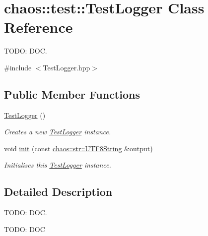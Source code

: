 \hypertarget{classchaos_1_1test_1_1_test_logger}{\section{chaos\-:\-:test\-:\-:Test\-Logger Class Reference}
\label{classchaos_1_1test_1_1_test_logger}
}


T\-O\-D\-O\-: D\-O\-C.  




{\ttfamily \#include $<$Test\-Logger.\-hpp$>$}

\subsection*{Public Member Functions}
\begin{DoxyCompactItemize}
\item 
\hypertarget{classchaos_1_1test_1_1_test_logger_a59b5462eea92053f301b8c5e9c61892f}{\hyperlink{classchaos_1_1test_1_1_test_logger_a59b5462eea92053f301b8c5e9c61892f}{Test\-Logger} ()}\label{classchaos_1_1test_1_1_test_logger_a59b5462eea92053f301b8c5e9c61892f}

\begin{DoxyCompactList}\small\item\em Creates a new \hyperlink{classchaos_1_1test_1_1_test_logger}{Test\-Logger} instance. \end{DoxyCompactList}\item 
void \hyperlink{classchaos_1_1test_1_1_test_logger_a5fec82749e25ffad7ae6b4f47ee0c4ec}{init} (const \hyperlink{classchaos_1_1str_1_1_u_t_f8_string}{chaos\-::str\-::\-U\-T\-F8\-String} \&output)
\begin{DoxyCompactList}\small\item\em Initialises this \hyperlink{classchaos_1_1test_1_1_test_logger}{Test\-Logger} instance. \end{DoxyCompactList}\end{DoxyCompactItemize}


\subsection{Detailed Description}
T\-O\-D\-O\-: D\-O\-C. 

T\-O\-D\-O\-: D\-O\-C 

